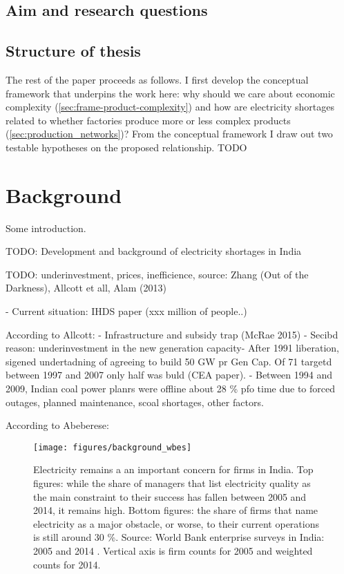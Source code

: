 \documentclass[11pt]{article}
\begin{document}
\subsection{Aim and research questions}%
\label{sub:aim_and_research_questions}

\subsection{Structure of thesis}%
\label{sub:structure_of_thesis}

The rest of the paper proceeds as follows. I first develop the conceptual framework that underpins the work here: why should we care about economic complexity (\ref{sec:frame-product-complexity}) and how are electricity shortages related to whether factories produce more or less complex products (\ref{sec:production_networks})? From the conceptual framework I draw out two testable hypotheses on the proposed relationship. TODO

\newpage
\section{Background}%
\label{sec:background}

Some introduction.


TODO: Development and background of electricity shortages in India


TODO: underinvestment, prices, inefficience, source: Zhang (Out of the Darkness), Allcott et all, Alam (2013)

- Current situation:
IHDS paper (xxx million of people..)



According to Allcott:
- Infrastructure and subsidy trap (McRae 2015)
- Secibd reason: underinvestment in the new generation capacity- After 1991 liberation, sigened undertadning of agreeing to build 50 GW pr Gen Cap. Of 71 targetd between 1997 and 2007 only half was buld (CEA paper).
- Between 1994 and 2009, Indian coal power planrs were offline about 28 \% pfo time due to forced outages, planned maintenance, scoal shortages, other factors. 

According to Abeberese:


\begin{figure}[htpb]
	\centering
	\texttt{[image: figures/background\_wbes]}
	\caption{Electricity remains a an important concern for firms in India. Top figures: while the share of managers that list electricity quality as the main constraint to their success has fallen between 2005 and 2014, it remains high. Bottom figures: the share of firms that name electricity as a major obstacle, or worse, to their current operations is still around 30 \%. Source: World Bank enterprise surveys in India: 2005 and 2014 \citep{world_bank_enterprise_2020-2,world_bank_enterprise_2020-1}. Vertical axis is firm counts for 2005 and weighted counts for 2014.}
	\label{fig:biggest_obstacle}
\end{figure}
\end{document}
